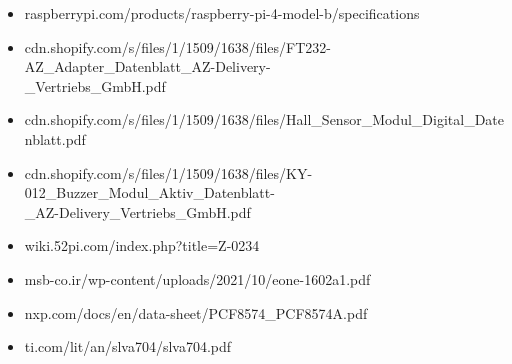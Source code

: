 \documentclass[]{article}
\begin{document}
\begin{itemize}
    \item raspberrypi.com/products/raspberry-pi-4-model-b/specifications
    \item cdn.shopify.com/s/files/1/1509/1638/files/FT232-AZ\_Adapter\_Datenblatt\_AZ-Delivery-
    \\\_Vertriebs\_GmbH.pdf
    \item cdn.shopify.com/s/files/1/1509/1638/files/Hall\_Sensor\_Modul\_Digital\_Datenblatt.pdf
    \item cdn.shopify.com/s/files/1/1509/1638/files/KY-012\_Buzzer\_Modul\_Aktiv\_Datenblatt-
    \\\_AZ-Delivery\_Vertriebs\_GmbH.pdf
    \item wiki.52pi.com/index.php?title=Z-0234
    \item msb-co.ir/wp-content/uploads/2021/10/eone-1602a1.pdf
    \item nxp.com/docs/en/data-sheet/PCF8574\_PCF8574A.pdf
    \item ti.com/lit/an/slva704/slva704.pdf
\end{itemize}
\end{document}
